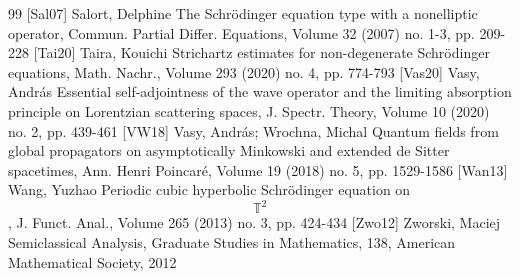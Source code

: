 \documentclass[10pt]{amsart}
\theoremstyle{definition}
\begin{document}
\begin{thebibliography}{99}
 [Sal07] Salort, Delphine The Schrödinger equation type with a nonelliptic operator, Commun. Partial Differ. Equations, Volume 32 (2007) no. 1-3, pp. 209-228
 [Tai20] Taira, Kouichi Strichartz estimates for non-degenerate Schrödinger equations, Math. Nachr., Volume 293 (2020) no. 4, pp. 774-793
 [Vas20] Vasy, András Essential self-adjointness of the wave operator and the limiting absorption principle on Lorentzian scattering spaces, J. Spectr. Theory, Volume 10 (2020) no. 2, pp. 439-461
 [VW18] Vasy, András; Wrochna, Michal Quantum fields from global propagators on asymptotically Minkowski and extended de Sitter spacetimes, Ann. Henri Poincaré, Volume 19 (2018) no. 5, pp. 1529-1586
 [Wan13] Wang, Yuzhao Periodic cubic hyperbolic Schrödinger equation on $$\mathbb{T}^{2}$$, J. Funct. Anal., Volume 265 (2013) no. 3, pp. 424-434
 [Zwo12] Zworski, Maciej Semiclassical Analysis, Graduate Studies in Mathematics, 138, American Mathematical Society, 2012
\end{thebibliography}
\end{document}
